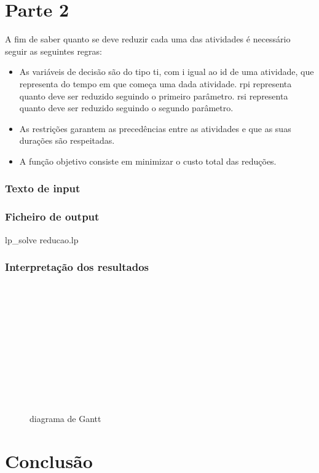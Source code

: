 \documentclass[a4paper]{report}
\begin{document}
\chapter{Parte 2}
A fim de saber quanto se deve reduzir cada uma das atividades é necessário
seguir as seguintes regras:
\begin{itemize}
    \item As variáveis de decisão são do tipo ti, com i igual ao id de uma
        atividade, que representa do tempo em que começa uma dada atividade.
        rpi representa quanto deve ser reduzido seguindo o primeiro parâmetro.
        rsi representa quanto deve ser reduzido seguindo o segundo parâmetro.
    \item As restrições garantem as precedências entre as atividades e que as
        suas durações são respeitadas.
    \item A função objetivo consiste em  minimizar o custo total das reduções.
\end{itemize}

\pagebreak
\subsection{Texto de input}


\pagebreak
\subsection{Ficheiro de output}
\bash[stdout]
lp_solve reducao.lp
\END

\subsection{Interpretação dos resultados}
\begin{figure}[H]
    \centering
    \begin{ganttchart}{1}{27}
        \\
        \\

        \\
        \\
        \\
        
        \\
        \\
        
        \\
        
        \\
        
        \\
    \end{ganttchart}
    \caption{diagrama de Gantt}
\end{figure}

\chapter{Conclusão}
\end{document}
